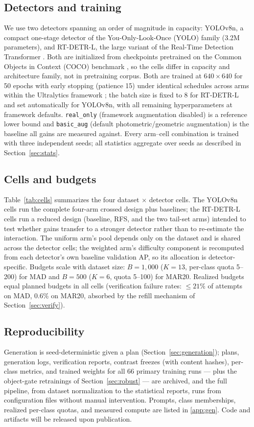 \documentclass[preprint,12pt,authoryear]{elsarticle}
\begin{document}
\subsection{Detectors and training}
We use two detectors spanning an order of magnitude in capacity:
YOLOv8n, a compact one-stage detector of the You-Only-Look-Once (YOLO)
family (3.2M parameters), and RT-DETR-L, the large variant of the
Real-Time Detection Transformer \citep[32M parameters;][]{zhao2024rtdetr}.
Both are initialized from checkpoints pretrained on the Common Objects
in Context (COCO) benchmark \citep{lin2014coco}, so the cells differ in capacity and
architecture family, not in pretraining corpus. Both are trained at
$640\times640$ for 50 epochs with early stopping (patience 15) under
identical schedules across arms within the Ultralytics framework
\citep{jocher2023ultralytics}; the batch size is fixed to 8 for
RT-DETR-L and set automatically for YOLOv8n, with all remaining
hyperparameters at framework defaults. \texttt{real\_only} (framework
augmentation disabled) is a reference lower bound and
\texttt{basic\_aug} (default photometric/geometric augmentation) is the
baseline all gains are measured against. Every arm--cell combination is
trained with three independent seeds; all statistics aggregate over
seeds as described in Section~\ref{sec:stats}.

\subsection{Cells and budgets}
Table~\ref{tab:cells} summarizes the four dataset $\times$ detector
cells. The YOLOv8n cells run the complete four-arm crossed design plus
baselines; the RT-DETR-L cells run a reduced design (baseline, RFS, and
the two tail-set arms) intended to test whether gains transfer to a
stronger detector rather than to re-estimate the interaction. The
uniform arm's pool depends only on the dataset and is shared across the
detector cells; the weighted arm's difficulty component is recomputed
from each detector's own baseline validation AP, so its allocation is
detector-specific. Budgets scale with dataset size: $B = 1{,}000$
($K = 13$, per-class quota 5--200) for MAD and $B = 500$ ($K = 6$, quota
5--100) for MAR20. Realized budgets equal planned budgets in all cells
(verification failure rates: $\leq 21\%$ of attempts on MAD, 0.6\% on
MAR20, absorbed by the refill mechanism of Section~\ref{sec:verify}).

\subsection{Reproducibility}
Generation is seed-deterministic given a plan
(Section~\ref{sec:generation}); plans, generation logs, verification
reports, contrast freezes (with content hashes), per-class metrics, and
trained weights for all 66 primary training runs --- plus the
object-gate retrainings of Section~\ref{sec:robust} --- are archived,
and the full pipeline, from dataset normalization to the statistical
reports, runs from configuration files without manual intervention.
Prompts, class memberships, realized per-class quotas, and measured
compute are listed in \ref{app:gen}. Code and artifacts will be
released upon publication.
\end{document}
